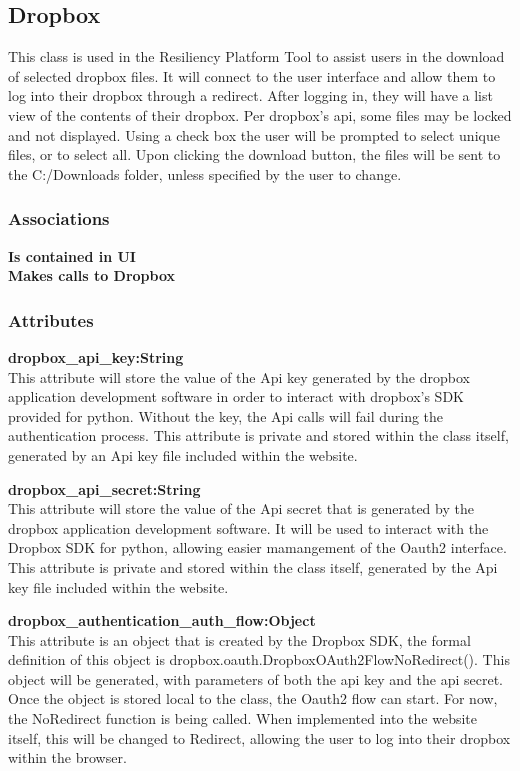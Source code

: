 \subsection{Dropbox}
This class is used in the Resiliency Platform Tool to assist users in the download of selected dropbox files.
It will connect to the user interface and allow them to log into their dropbox through a redirect. After logging
in, they will have a list view of the contents of their dropbox. Per dropbox's api, some files may be locked and 
not displayed. Using a check box the user will be prompted to select unique files, or to select all. Upon clicking 
the download button, the files will be sent to the C:/Downloads folder, unless specified by the user to change.

\subsubsection{Associations}
\textbf{Is contained in UI} \\

\textbf{Makes calls to Dropbox} \\

\subsubsection{Attributes}
\textbf{dropbox\_api\_key:String} \\
    This attribute will store the value of the Api key generated by the dropbox application development software 
    in order to interact with dropbox's SDK provided for python. Without the key, the Api calls will fail during 
    the authentication process. This attribute is private and stored within the class itself, generated by an Api
    key file included within the website.

\textbf{dropbox\_api\_secret:String} \\
    This attribute will store the value of the Api secret that is generated by the dropbox application development
    software. It will be used to interact with the Dropbox SDK for python, allowing easier mamangement of the Oauth2
    interface. This attribute is private and stored within the class itself, generated by the Api key file included 
    within the website.

\textbf{dropbox\_authentication\_auth\_flow:Object} \\
    This attribute is an object that is created by the Dropbox SDK, the formal definition of this object is 
    dropbox.oauth.DropboxOAuth2FlowNoRedirect(). This object will be generated, with parameters of both the api key
    and the api secret. Once the object is stored local to the class, the Oauth2 flow can start. For now, the NoRedirect
    function is being called. When implemented into the website itself, this will be changed to Redirect, allowing the 
    user to log into their dropbox within the browser. 

